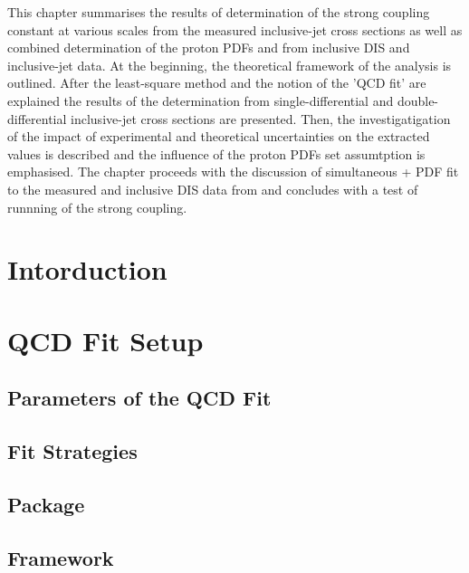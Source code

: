 This chapter summarises the results of determination of the strong coupling constant at various scales from the measured inclusive-jet cross sections as well as combined determination of the proton PDFs and \asz from inclusive DIS and inclusive-jet data. At the beginning, the theoretical framework of the analysis is outlined. After the least-square method and the notion of the 'QCD fit' are explained the results of the \asz determination from single-differential and double-differential inclusive-jet cross sections are presented. Then, the investigatigation of the impact of experimental and theoretical uncertainties on the extracted \asz values is described and the influence of the proton PDFs set assumtption is emphasised. The chapter proceeds with the discussion of simultaneous \as + PDF fit to the measured and inclusive DIS data from \hera and concludes with a test of runnning of the strong coupling.

\section{Intorduction}
\label{sec:qcdfitintro}


\section{QCD Fit Setup}
\label{sec:fitsettings}


\subsection{Parameters of the QCD Fit}
\label{subsec:qcdfitparams}



\subsection{Fit Strategies}
\label{subsec:fitstategy}


\subsection{\herafitter Package}
\label{subsec:herfitter}


\subsection{\fastnlo Framework}
\label{subsec:fastnlo}


